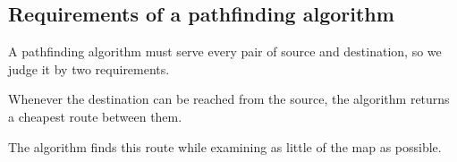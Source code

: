 \subsection{Requirements of a pathfinding algorithm}\label{sec:requirements}

A pathfinding algorithm must serve every pair of source and destination, so we
judge it by two requirements.
\begin{description}[font=\normalfont\bfseries, leftmargin=1.5em, labelindent=0pt]
  \item[Optimality.] Whenever the destination can be reached from the source,
    the algorithm returns a cheapest route between them.
  \item[Efficiency.] The algorithm finds this route while examining as little
    of the map as possible.
\end{description}
